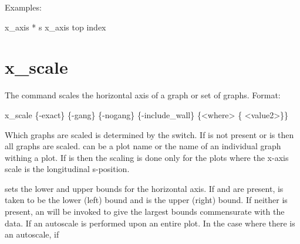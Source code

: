 {{{{{{{{{{{{Examples:
\begin{example}
  x_axis * s
  x_axis top index
\end{example}

\section{x_scale}
\label{s:x.scale}

The  command scales the horizontal axis of a graph or set of graphs. Format:
\begin{example}
  x_scale \{-exact\} \{-gang\} \{-nogang\} \{-include_wall\} \{<where> \{<value1> <value2>\}\}
\end{example}

Which graphs are scaled is determined by the  switch. If  is not present or
 is \vn{*} then all graphs are scaled.  can be a plot name or the name of an
individual graph withing a plot. If  is  then the scaling is done only for the
plots where the x-axis scale is the longitudinal s-position.

 sets the lower and upper bounds for the horizontal axis.  If  and
 are present,  is taken to be the lower (left) bound and  is
the upper (right) bound. If neither is present, an  will be invoked to give the
largest bounds commensurate with the data. If an autoscale is performed upon an entire plot. In the
case where there is an autoscale, if \vn{plot%
the chosen scales will be the same for all graphs. That is, a single scale is calculated so that all
the data of all the graphs is within the plot region. The affect of \vn{plot%
be overridden by using the \vn{-gang} or \vn{-nogang} switches.

How a graph is scaled is determined in part by the setting of the \vn{bounds} parameter in the
\vn{x} parameter of the graph. See \vn{s:quick.plot} for more details. The \vn{-exact} switch, if
present, will set \vn{bounds} to \vn{"EXACT"}. which means that \tao will use the min and
max bounds as given by \vn{<value1>} and \vn{<value2>} and not try to find ``nice'' values near the
given ones. If \vn{<value1>} and \vn{<value2>} are not given, and if \vn{bounds} is set to
\vn{"EXACT"}, \tao will set \vn{bounds} to \vn{"GENERAL"}. Note: To set the axis \vn{bounds}
directly, use the \vn{set graph} command.

}}}}}}}}}}}}}}
